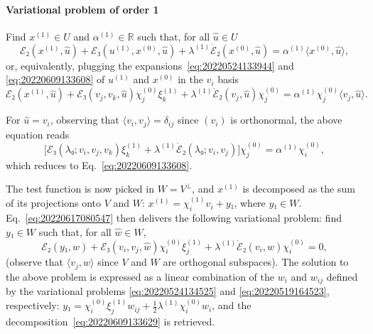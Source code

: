 \documentclass[12pt, final]{scrartcl}
\theoremstyle{definition}
\newcommand{\order}[2][1]{#2^{(#1)}}
\newcommand{\reals}{\mathbb{R}}
\begin{document}
\paragraph{Variational problem of order 1} Find \(\order[1]x∈U\) and \(\order[1]α∈\reals\) such
that, for all \(\hat{u}∈U\)
\begin{equation}
  \label{eq:20220609131953}
  ℰ₂(\order[1]x, \hat{u}) + ℰ₃(\order[1]u, \order[0]x, \hat{u}) + \order[1]λ \dot{ℰ}₂(\order[0]x, \hat{u}) = \order[1]α 〈 \order[0]x, \hat{u} 〉,
\end{equation}
or, equivalently, plugging the expansions~\eqref{eq:20220524133944} and
\eqref{eq:20220609133608} of \(\order[1]u\) and \(\order[0]x\) in the \(v_i\) basis
\begin{equation}
  \label{eq:20220617080547}
  ℰ₂(\order[1]x, \hat{u}) + ℰ₃(v_j, v_k, \hat{u}) \order[0]{χ_j} \order[1]{ξ_k} + \order[1]λ \dot{ℰ}₂(v_j, \hat{u}) \order[0]{χ_j} = \order[1]α \order[0]{χ_j} 〈 v_j, \hat{u} 〉.
\end{equation}

For \(\hat{u} = v_i\), observing that \(〈 v_i, v_j 〉 = δ_{ij}\) since
\((v_i)\) is orthonormal, the above equation reads
\begin{equation}
  \bigl[ℰ₃(λ₀; v_i, v_j, v_k) \order[1]{ξ_k} + \order[1]λ \dot{ℰ}₂(λ₀; v_i, v_j)\bigr] \order[0]{χ_j} = \order[1]α \order[0]{χ_i},
\end{equation}
which reduces to Eq.~\eqref{eq:20220609133608}.

The test function is now picked in \(W = V^\perp\), and \(\order[1]x\) is decomposed as
the sum of its projections onto \(V\) and \(W\): \(\order[1]x = \order[1]{χ_i} v_i + y₁\), where
\(y₁ ∈ W\). Eq.~\eqref{eq:20220617080547} then delivers the following
variational problem: find \(y₁ ∈ W\) such that, for all \(\hat{w} ∈ W\),
\begin{equation}
  ℰ₂(y₁, \hat{w}) + ℰ₃(v_i, v_j, \hat{w}) \order[0]{χ_i} \order[1]{ξ_j} + \order[1]λ \dot{ℰ}₂(v_i, \hat{w}) \order[0]{χ_i} = 0,
\end{equation}
(observe that \(〈 v_j, \hat{w} 〉\) since \(V\) and \(W\) are orthogonal
subspaces). The solution to the above problem is expressed as a linear
combination of the \(w_i\) and \(w_{ij}\) defined by the variational problems
\eqref{eq:20220524134525} and \eqref{eq:20220519164523}, respectively:
\(y₁ = \order[0]{χ_i} \order[1]{ξ_j} w_{i j} + \tfrac{1}{2} \order[1]λ \order[0]{χ_i} w_i\), and the
decomposition~\eqref{eq:20220609133629} is retrieved.
\end{document}
